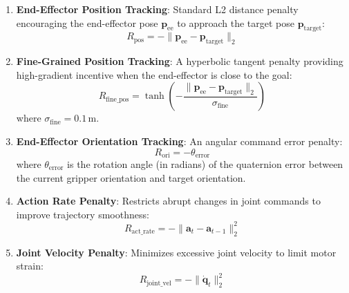\begin{enumerate}
    \item \textbf{End-Effector Position Tracking}: Standard L2 distance penalty encouraging the end-effector pose $\boldsymbol{p}_{\mathrm{ee}}$ to approach the target pose $\boldsymbol{p}_{\mathrm{target}}$:
    \begin{equation}
        R_{\mathrm{pos}} = - \|\boldsymbol{p}_{\mathrm{ee}} - \boldsymbol{p}_{\mathrm{target}}\|_2
    \end{equation}

    \item \textbf{Fine-Grained Position Tracking}: A hyperbolic tangent penalty providing high-gradient incentive when the end-effector is close to the goal:
    \begin{equation}
        R_{\mathrm{fine\_pos}} = \tanh\left(-\frac{\|\boldsymbol{p}_{\mathrm{ee}} - \boldsymbol{p}_{\mathrm{target}}\|_2}{\sigma_{\mathrm{fine}}}\right)
    \end{equation}
    where $\sigma_{\mathrm{fine}} = 0.1$\,m.

    \item \textbf{End-Effector Orientation Tracking}: An angular command error penalty:
    \begin{equation}
        R_{\mathrm{ori}} = - \theta_{\mathrm{error}}
    \end{equation}
    where $\theta_{\mathrm{error}}$ is the rotation angle (in radians) of the quaternion error between the current gripper orientation and target orientation.

    \item \textbf{Action Rate Penalty}: Restricts abrupt changes in joint commands to improve trajectory smoothness:
    \begin{equation}
        R_{\mathrm{act\_rate}} = - \|\boldsymbol{a}_t - \boldsymbol{a}_{t-1}\|_2^2
    \end{equation}

    \item \textbf{Joint Velocity Penalty}: Minimizes excessive joint velocity to limit motor strain:
    \begin{equation}
        R_{\mathrm{joint\_vel}} = - \|\dot{\boldsymbol{q}}_t\|_2^2
    \end{equation}
\end{enumerate}

